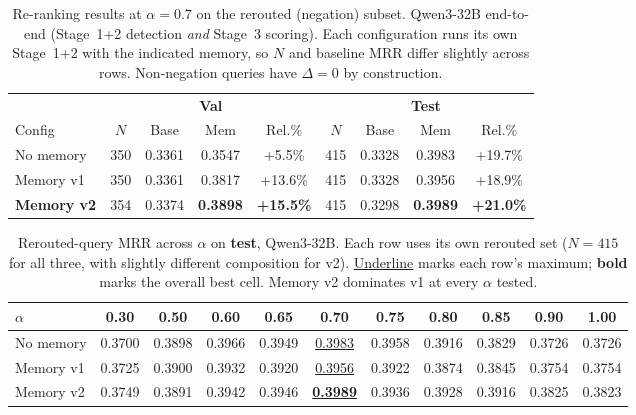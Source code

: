 \begin{table}[t]
\caption{Re-ranking results at $\alpha = 0.7$ on the rerouted (negation) subset.
Qwen3-32B end-to-end (Stage~1+2 detection \emph{and} Stage~3 scoring).
Each configuration runs its own Stage~1+2 with the indicated memory, so $N$ and baseline MRR
differ slightly across rows. Non-negation queries have $\Delta = 0$ by construction.}
\label{tab:main}
\centering
\small
\begin{tabular}{l cccc | cccc}
\toprule
 & \multicolumn{4}{c}{\textbf{Val}} & \multicolumn{4}{c}{\textbf{Test}} \\
\cmidrule(lr){2-5}\cmidrule(lr){6-9}
Config & $N$ & Base & Mem & Rel.\% & $N$ & Base & Mem & Rel.\% \\
\midrule
No memory          & 350 & 0.3361 & 0.3547 & +5.5\%  & 415 & 0.3328 & 0.3983 & +19.7\% \\
Memory v1          & 350 & 0.3361 & 0.3817 & +13.6\% & 415 & 0.3328 & 0.3956 & +18.9\% \\
\textbf{Memory v2} & 354 & 0.3374 & \textbf{0.3898} & \textbf{+15.5\%}
                   & 415 & 0.3298 & \textbf{0.3989} & \textbf{+21.0\%} \\
\bottomrule
\end{tabular}
\end{table}


\begin{table}[t]
\caption{Rerouted-query MRR across $\alpha$ on \textbf{test}, Qwen3-32B.
Each row uses its own rerouted set ($N=415$ for all three, with slightly different composition for v2).
\underline{Underline} marks each row's maximum; \textbf{bold} marks the overall best cell.
Memory v2 dominates v1 at every $\alpha$ tested.}
\label{tab:alpha}
\centering
\small
\begin{tabular}{l cccccccccc}
\toprule
$\alpha$ & 0.30 & 0.50 & 0.60 & 0.65 & 0.70 & 0.75 & 0.80 & 0.85 & 0.90 & 1.00 \\
\midrule
No memory  & 0.3700 & 0.3898 & 0.3966 & 0.3949 & \underline{0.3983} & 0.3958 & 0.3916 & 0.3829 & 0.3726 & 0.3726 \\
Memory v1  & 0.3725 & 0.3900 & 0.3932 & 0.3920 & \underline{0.3956} & 0.3922 & 0.3874 & 0.3845 & 0.3754 & 0.3754 \\
Memory v2  & 0.3749 & 0.3891 & 0.3942 & 0.3946 & \underline{\textbf{0.3989}} & 0.3936 & 0.3928 & 0.3916 & 0.3825 & 0.3823 \\
\bottomrule
\end{tabular}
\end{table}


